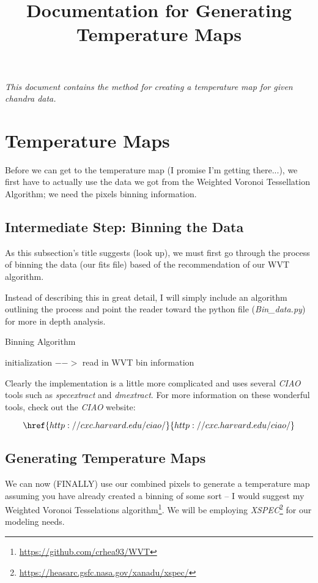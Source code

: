 \documentclass[11pt,letterpaper]{article}
\begin{document}
\univlogo

\title{Documentation for Generating Temperature Maps}

\textit{This document contains the method for creating a temperature map for given chandra data.}

\tableofcontents

\newpage


\section{Temperature Maps}

Before we can get to the temperature map (I promise I'm getting there...), we first have to actually use the data we got from the Weighted Voronoi Tessellation Algorithm; we need the pixels binning information.
\subsection{Intermediate Step: Binning the Data}
As this subsection's title suggests (look up), we must first go through the process of binning the data (our fits file) based of the recommendation of our WVT algorithm.


Instead of describing this in great detail, I will simply include an algorithm outlining the process and point the reader toward the python file (\textit{Bin\_data.py}) for more in depth analysis.

\begin{algorithm}[H]\label{algo:InterMediate}
	\caption{Binning Algorithm}
	initialization $-->$ read in WVT bin information\;
\end{algorithm}

Clearly the implementation is a little more complicated and uses several \textit{CIAO} tools such as \textit{specextract} and \textit{dmextract}. For more information on these wonderful tools, check out the \textit{CIAO} website:

$$\href{http://cxc.harvard.edu/ciao/}{http://cxc.harvard.edu/ciao/} $$


\subsection{Generating Temperature Maps}
We can now (FINALLY) use our combined pixels to generate a temperature map assuming you have already created a binning of some sort -- I would suggest my Weighted Voronoi Tesselations algorithm\footnote{\href{https://github.com/crhea93/WVT}{https://github.com/crhea93/WVT}}. We will be employing \textit{XSPEC}\footnote{\href{https://heasarc.gsfc.nasa.gov/xanadu/xspec/}{https://heasarc.gsfc.nasa.gov/xanadu/xspec/}} for our modeling needs.
\end{document}
